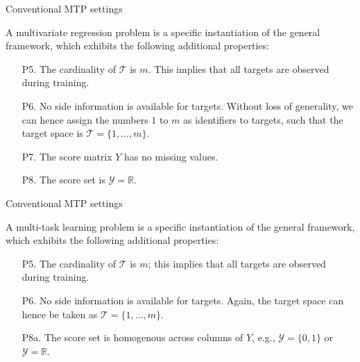 \documentclass[]{beamer}
\begin{document}
\begin{frame}{Conventional MTP settings}
\begin{definition} 
A multivariate regression problem is a specific instantiation of the general framework, which exhibits the following additional properties: 
\begin{enumerate}
\item[P5.] The cardinality of $\mathcal{T}$ is $m$. This implies that all targets are observed during training. 
\item[P6.] No side information is available for targets. Without loss of generality, we can hence assign the numbers $1$ to $m$ as identifiers to targets, such that the target space is $\mathcal{T} = \{1,...,m\}$. 
\item[P7.] The score matrix $Y$ has no missing values. 
\item[P8.] The score set is $\mathcal{Y} = \mathbb{R}$. 
\end{enumerate}
\end{definition}
\end{frame}

\begin{frame}{Conventional MTP settings}
\begin{definition} 
A multi-task learning problem is a specific instantiation of the general framework, which exhibits the following additional properties: 
\begin{enumerate}
\item[P5.] The cardinality of $\mathcal{T}$ is $m$; this implies that all targets are observed during training. 
\item[P6.] No side information is available for targets. Again, the target space can hence be taken as $\mathcal{T} = \{1,...,m\}$.   
\item[P8a.] The score set is homogenous across columns of $Y$, e.g., $\mathcal{Y} = \{0,1\}$ or $\mathcal{Y} = \mathbb{R}$.
\end{enumerate}
\end{definition}
\end{frame}
\end{document}
